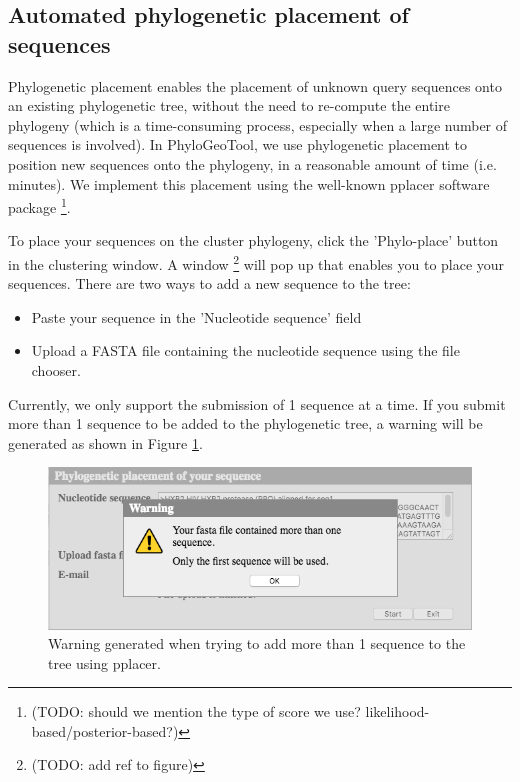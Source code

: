 \documentclass[a4paper, 11pt]{article} %
\begin{document}
\subsection{Automated phylogenetic placement of sequences}
Phylogenetic placement enables the placement of unknown query sequences onto an existing phylogenetic tree, without the need to re-compute the entire phylogeny (which is a time-consuming process, especially when a large number of sequences is involved). 
In PhyloGeoTool, we use phylogenetic placement to position new sequences onto the phylogeny, in a reasonable amount of time (i.e. minutes). 
We implement this placement using the well-known pplacer software package \cite{Matsen2010} \footnote{(TODO: should we mention the type of score we use? likelihood-based/posterior-based?)}.

To place your sequences on the cluster phylogeny, click the 'Phylo-place' button in the clustering window. 
A window \footnote{(TODO: add ref to figure)} will pop up that enables you to place your sequences. 
There are two ways to add a new sequence to the tree:
\begin{itemize}
\item Paste your sequence in the 'Nucleotide sequence' field
\item Upload a FASTA file containing the nucleotide sequence using the file chooser.
\end{itemize}
Currently, we only support the submission of 1 sequence at a time.
If you submit more than 1 sequence to be added to the phylogenetic tree, a warning will be generated as shown in Figure \ref{fig:pplacer-warning}.


\begin{figure}[H]
\centering
\includegraphics[scale=0.50]{images/pplacer-warning.png}
\vspace{-0.25cm}
\caption{Warning generated when trying to add more than 1 sequence to the tree using pplacer.}
\label{fig:pplacer-warning}
\end{figure}
\end{document}
